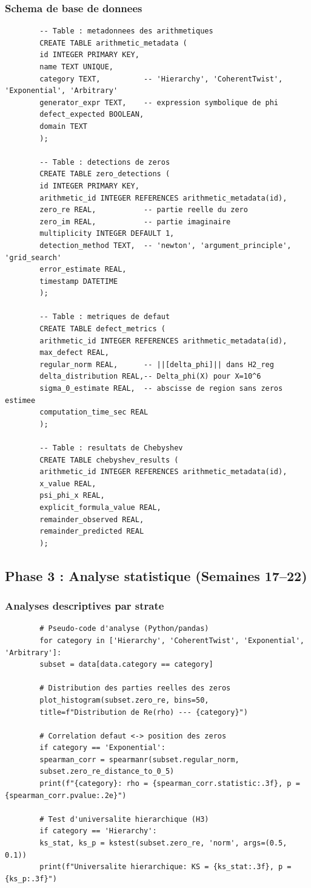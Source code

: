 \documentclass[11pt,a4paper]{article}
\begin{document}
	\subsubsection{Schema de base de donnees}
	\begin{verbatim}
		-- Table : metadonnees des arithmetiques
		CREATE TABLE arithmetic_metadata (
		id INTEGER PRIMARY KEY,
		name TEXT UNIQUE,
		category TEXT,          -- 'Hierarchy', 'CoherentTwist', 'Exponential', 'Arbitrary'
		generator_expr TEXT,    -- expression symbolique de phi
		defect_expected BOOLEAN,
		domain TEXT
		);
		
		-- Table : detections de zeros
		CREATE TABLE zero_detections (
		id INTEGER PRIMARY KEY,
		arithmetic_id INTEGER REFERENCES arithmetic_metadata(id),
		zero_re REAL,           -- partie reelle du zero
		zero_im REAL,           -- partie imaginaire
		multiplicity INTEGER DEFAULT 1,
		detection_method TEXT,  -- 'newton', 'argument_principle', 'grid_search'
		error_estimate REAL,
		timestamp DATETIME
		);
		
		-- Table : metriques de defaut
		CREATE TABLE defect_metrics (
		arithmetic_id INTEGER REFERENCES arithmetic_metadata(id),
		max_defect REAL,
		regular_norm REAL,      -- ||[delta_phi]|| dans H2_reg
		delta_distribution REAL,-- Delta_phi(X) pour X=10^6
		sigma_0_estimate REAL,  -- abscisse de region sans zeros estimee
		computation_time_sec REAL
		);
		
		-- Table : resultats de Chebyshev
		CREATE TABLE chebyshev_results (
		arithmetic_id INTEGER REFERENCES arithmetic_metadata(id),
		x_value REAL,
		psi_phi_x REAL,
		explicit_formula_value REAL,
		remainder_observed REAL,
		remainder_predicted REAL
		);
	\end{verbatim}
	
	\subsection{Phase 3 : Analyse statistique (Semaines 17--22)}
	
	\subsubsection{Analyses descriptives par strate}
	\begin{verbatim}
		# Pseudo-code d'analyse (Python/pandas)
		for category in ['Hierarchy', 'CoherentTwist', 'Exponential', 'Arbitrary']:
		subset = data[data.category == category]
		
		# Distribution des parties reelles des zeros
		plot_histogram(subset.zero_re, bins=50, 
		title=f"Distribution de Re(rho) --- {category}")
		
		# Correlation defaut <-> position des zeros
		if category == 'Exponential':
		spearman_corr = spearmanr(subset.regular_norm, 
		subset.zero_re_distance_to_0_5)
		print(f"{category}: rho = {spearman_corr.statistic:.3f}, p = {spearman_corr.pvalue:.2e}")
		
		# Test d'universalite hierarchique (H3)
		if category == 'Hierarchy':
		ks_stat, ks_p = kstest(subset.zero_re, 'norm', args=(0.5, 0.1))
		print(f"Universalite hierarchique: KS = {ks_stat:.3f}, p = {ks_p:.3f}")
	\end{verbatim}
	
\end{document}
